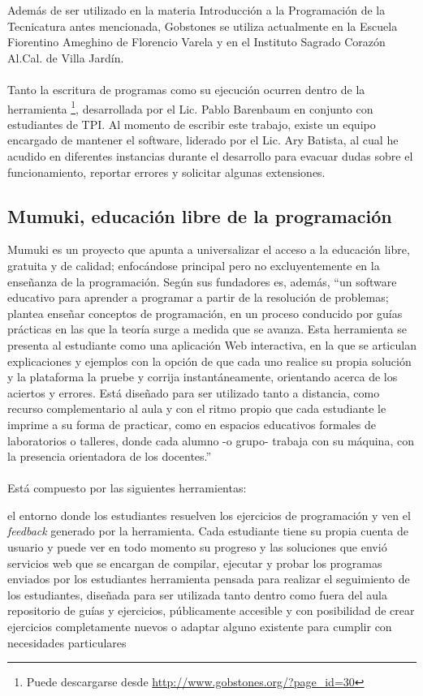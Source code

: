 Además de ser utilizado en la materia Introducción a la Programación de la Tecnicatura antes mencionada, Gobstones se utiliza actualmente en la Escuela Fiorentino Ameghino de Florencio Varela y en el Instituto Sagrado Corazón Al.Cal. de Villa Jardín.
\\\\
Tanto la escritura de programas como su ejecución ocurren dentro de la herramienta \footnote{Puede descargarse desde \url{http://www.gobstones.org/?page_id=30}}, desarrollada por el Lic. Pablo Barenbaum en conjunto con estudiantes de TPI. Al momento de escribir este trabajo, existe un equipo encargado de mantener el software, liderado por el Lic. Ary Batista, al cual he acudido en diferentes instancias durante el desarrollo para evacuar dudas sobre el funcionamiento, reportar errores y solicitar algunas extensiones.

\subsection{Mumuki, educación libre de la programación}
Mumuki es un proyecto que apunta a universalizar el acceso a la educación libre, gratuita y de calidad; enfocándose principal pero no excluyentemente en la enseñanza de la programación. Según sus fundadores es, además, ``un software educativo para aprender a programar a partir de la resolución de problemas; plantea enseñar conceptos de programación, en un proceso conducido por guías prácticas en las que la teoría surge a medida que se avanza. Esta herramienta se presenta al estudiante como una aplicación Web interactiva, en la que se articulan explicaciones y ejemplos con la opción de que cada uno realice su propia solución y la plataforma la pruebe y corrija instantáneamente, orientando acerca de los aciertos y errores. Está diseñado para ser utilizado tanto a distancia, como recurso complementario al aula y con el ritmo propio que cada estudiante le imprime a su forma de practicar, como en espacios educativos formales de laboratorios o talleres, donde cada alumno -o grupo- trabaja con su máquina, con la presencia orientadora de los docentes.''\cite{PaperMumuki}
\\\\
Está compuesto por las siguientes herramientas:
\begin{itemize}
   el entorno donde los estudiantes resuelven los ejercicios de programación y ven el \textit{feedback} generado por la herramienta. Cada estudiante tiene su propia cuenta de usuario y puede ver en todo momento su progreso y las soluciones que envió
   servicios web que se encargan de compilar, ejecutar y probar los programas enviados por los estudiantes
   herramienta pensada para realizar el seguimiento de los estudiantes, diseñada para ser utilizada tanto dentro como fuera del aula
   repositorio de guías y ejercicios, públicamente accesible y con posibilidad de crear ejercicios completamente nuevos o adaptar alguno existente para cumplir con necesidades particulares
\end{itemize}

